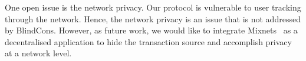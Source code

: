 \documentclass[conference]{llncs}
\newcommand{\name}{BlindCons}
\begin{document}
One open issue is the network privacy. Our protocol is vulnerable to user tracking through the network. Hence, the network privacy is an issue that is not addressed by \name{}. However, as future work, we would like to integrate Mixnets~\cite{Chaum:1981:UEM:358549.358563} as a decentralised application to hide the transaction source and accomplish privacy at a network level.



\end{document}
